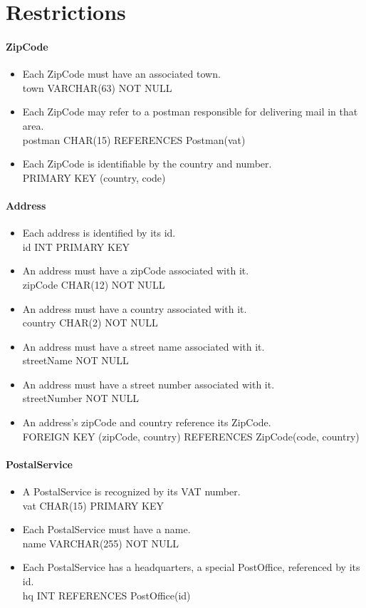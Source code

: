 \documentclass{report}[a4paper]
\theoremstyle{remark}
\begin{document}
\chapter{Restrictions}
\subsubsection{ZipCode}
\begin{itemize}
    \item Each ZipCode must have an associated town. \\ town VARCHAR(63) NOT NULL
    \item Each ZipCode may refer to a postman responsible for delivering mail in that area. \\ postman CHAR(15) REFERENCES Postman(vat)
    \item Each ZipCode is identifiable by the country and number. \\ PRIMARY KEY (country, code)
\end{itemize}
\subsubsection{Address}
\begin{itemize}
    \item Each address is identified by its id. \\ id INT PRIMARY KEY
    \item An address must have a zipCode associated with it. \\ zipCode CHAR(12) NOT NULL
    \item An address must have a country associated with it. \\ country CHAR(2) NOT NULL
    \item An address must have a street name associated with it. \\ streetName NOT NULL
    \item An address must have a street number associated with it. \\ streetNumber NOT NULL
    \item An address's zipCode and country reference its ZipCode. \\ FOREIGN KEY (zipCode, country) REFERENCES ZipCode(code, country)
\end{itemize}
\subsubsection{PostalService}
\begin{itemize}
    \item A PostalService is recognized by its VAT number. \\ vat CHAR(15) PRIMARY KEY
    \item Each PostalService must have a name. \\ name VARCHAR(255) NOT NULL
    \item Each PostalService has a headquarters, a special PostOffice, referenced by its id. \\ hq INT REFERENCES PostOffice(id)
\end{itemize}
\end{document}
